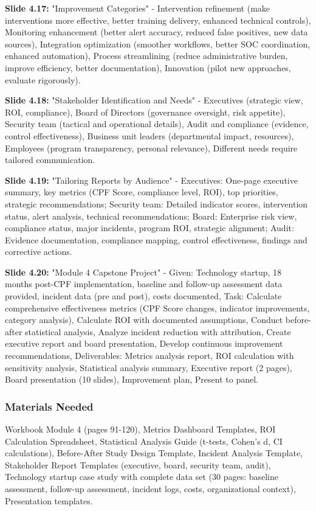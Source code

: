\documentclass[11pt,a4paper]{article}
\begin{document}
\textbf{Slide 4.17:} "Improvement Categories" - Intervention refinement (make interventions more effective, better training delivery, enhanced technical controls), Monitoring enhancement (better alert accuracy, reduced false positives, new data sources), Integration optimization (smoother workflows, better SOC coordination, enhanced automation), Process streamlining (reduce administrative burden, improve efficiency, better documentation), Innovation (pilot new approaches, evaluate rigorously).

\textbf{Slide 4.18:} "Stakeholder Identification and Needs" - Executives (strategic view, ROI, compliance), Board of Directors (governance oversight, risk appetite), Security team (tactical and operational details), Audit and compliance (evidence, control effectiveness), Business unit leaders (departmental impact, resources), Employees (program transparency, personal relevance), Different needs require tailored communication.

\textbf{Slide 4.19:} "Tailoring Reports by Audience" - Executives: One-page executive summary, key metrics (CPF Score, compliance level, ROI), top priorities, strategic recommendations; Security team: Detailed indicator scores, intervention status, alert analysis, technical recommendations; Board: Enterprise risk view, compliance status, major incidents, program ROI, strategic alignment; Audit: Evidence documentation, compliance mapping, control effectiveness, findings and corrective actions.

\textbf{Slide 4.20:} "Module 4 Capstone Project" - Given: Technology startup, 18 months post-CPF implementation, baseline and follow-up assessment data provided, incident data (pre and post), costs documented, Task: Calculate comprehensive effectiveness metrics (CPF Score changes, indicator improvements, category analysis), Calculate ROI with documented assumptions, Conduct before-after statistical analysis, Analyze incident reduction with attribution, Create executive report and board presentation, Develop continuous improvement recommendations, Deliverables: Metrics analysis report, ROI calculation with sensitivity analysis, Statistical analysis summary, Executive report (2 pages), Board presentation (10 slides), Improvement plan, Present to panel.

\subsubsection{Materials Needed}

Workbook Module 4 (pages 91-120), Metrics Dashboard Templates, ROI Calculation Spreadsheet, Statistical Analysis Guide (t-tests, Cohen's d, CI calculations), Before-After Study Design Template, Incident Analysis Template, Stakeholder Report Templates (executive, board, security team, audit), Technology startup case study with complete data set (30 pages: baseline assessment, follow-up assessment, incident logs, costs, organizational context), Presentation templates.
\end{document}
